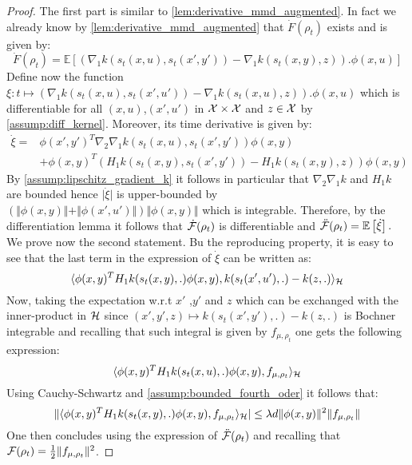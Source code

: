 \begin{proof}
The first part is similar to \cref{lem:derivative_mmd_augmented}. In fact we already know by \cref{lem:derivative_mmd_augmented} that $\dot{F}(\rho_t)$ exists and is given by:
\[
\dot{F}(\rho_t) = \mathbb{E}\left[(\nabla_1 k(s_t(x,u),s_t(x',y'))-\nabla_1 k(s_t(x,y),z)).\phi(x,u)\right]
\]
Define now the function $\xi : t\mapsto (\nabla_1 k(s_t(x,u),s_t(x',u'))-\nabla_1 k(s_t(x,u),z)).\phi(x,u)$ which is differentiable for all $(x,u)$,$(x',u')$ in ${{\mathcal X}}\times {{\mathcal X}}$ and $z\in {{\mathcal X}}$ by \cref{assump:diff_kernel}. Moreover, its time derivative is given by:
\begin{align}
	\dot{\xi} =& \phi(x',y')^T \nabla_2\nabla_1k(s_t(x,u),s_t(x',y'))\phi(x,y) \\
	&+ \phi(x,y)^T(H_1k(s_t(x,y),s_t(x',y') ) - H_1k(s_t(x,y),z ))\phi(x,y)  
\end{align}
By \cref{assump:lipschitz_gradient_k} it follows in particular that $\nabla_2\nabla_1k$ and $H_1k$ are bounded hence $\vert \dot{\xi} \vert$  is upper-bounded by $ (\Vert \phi(x,y) \Vert + \Vert\phi(x',u') \Vert)\Vert \phi(x,y)\Vert$ which is integrable.
Therefore, by the differentiation lemma \cite[Theorem 6.28]{Klenke:2008} it follows that $\dot{{{\mathcal F}}}(\rho_t)$ is differentiable and $\ddot{{{\mathcal F}}}(\rho_t) = \mathbb{E}\left[\dot{\xi}\right].$
We prove now the second statement. Bu the reproducing property, it is easy to see that the last term in the expression of $\dot{\xi}$ can be written as:
\[
\langle \phi(x,y)^TH_1 k(s_t(x,y),.)\phi(x,y), k(s_t(x',u'),.)-  k(z,.)\rangle_{{{\mathcal H}}} 
\]
Now, taking the expectation w.r.t $x'$  ,$y'$ and $z$ which can be exchanged with the inner-product in ${{\mathcal H}}$ since  $(x',y',z)\mapsto k(s_t(x',y'),.)-  k(z,.)$ is Bochner integrable \cite[Definition 1, Theorem 6]{Retherford:1978} and recalling that such integral is given by $f_{\mu,\rho_t}$  one gets the following expression:
\[
 \langle  \phi(x,y)^TH_1 k(s_t(x,u),.)\phi(x,y), f_{\mu,\rho_t} \rangle_{{{\mathcal H}}}
\]
Using Cauchy-Schwartz and \cref{assump:bounded_fourth_oder} it follows that:
\[
\Vert \langle  \phi(x,y)^TH_1 k(s_t(x,y),.)\phi(x,y), f_{\mu,\rho_t} \rangle_{{{\mathcal H}}}\vert \leq \lambda d\Vert \phi(x,y)\Vert^2 \Vert f_{\mu,\rho_t}\Vert 
\]
One then concludes using the expression of $\ddot{{{\mathcal F}}}(\rho_t)$ and recalling that ${{\mathcal F}}(\rho_t) = \frac{1}{2}\Vert f_{\mu,\rho_t} \Vert^2$.
\end{proof}


